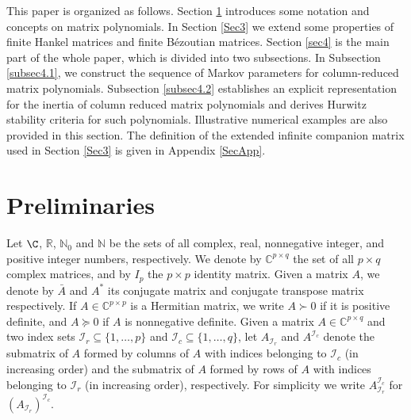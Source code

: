 \documentclass[12pt,reqno]{amsart}
\theoremstyle{plain}
\numberwithin{equation}{section}
\theoremstyle{remark}
\def \N{\mathbb N} \def\B{\mathfrak B}
\newcommand{\R}{\mathbb{R}}
\begin{document}
This paper is organized as follows. Section \ref{Sec2} introduces some notation and concepts on matrix polynomials. In Section \ref{Sec3} we extend some properties of finite Hankel matrices and finite B\'ezoutian matrices. Section \ref{sec4} is the main part of the whole paper, which is divided into two subsections. In Subsection \ref{subsec4.1}, we construct the sequence of Markov parameters for column-reduced matrix polynomials. Subsection \ref{subsec4.2} establishes an explicit  representation for the inertia of column reduced matrix polynomials and derives Hurwitz stability criteria for such polynomials. Illustrative numerical examples are also provided in this section. The definition of the extended infinite companion matrix used in Section \ref{Sec3} is given in Appendix \ref{SecApp}. 


\section{Preliminaries}\label{Sec2}
 Let $\C$, $\R$, $\N_0$ and $\N$ be the sets
of all complex, real, nonnegative integer, and positive integer numbers, respectively. We denote by $\mathbb C^{p\times q}$ the set of all $p\times q$ complex matrices, and by  $I_p$ the $p\times p$ identity matrix. 
Given a matrix $A$, we denote by $\bar A$ and $A^*$ its conjugate matrix and  conjugate transpose matrix respectively. If $A\in \mathbb C^{p\times p}$ is a Hermitian matrix, we write $A\succ 0$ if it is positive definite, and $A\succeq 0$ if $A$ is nonnegative definite.
Given a matrix $A\in \mathbb C^{p\times q}$ and two index sets $\mathcal I_r\subseteq \{1,\ldots,p\}$ and $\mathcal I_c\subseteq \{1,\ldots,q\}$, let $A_{\mathcal I_r}$  and $A^{\mathcal I_c}$ denote the submatrix of $A$ formed by columns of $A$ with indices belonging to $\mathcal I_c$ (in increasing order) and the submatrix of $A$ formed by rows of $A$ with indices belonging to $\mathcal I_r$ (in increasing order), respectively. For simplicity we write $A_{\mathcal I_r}^{\mathcal I_c}$ for $(A_{\mathcal I_r})^{\mathcal I_c}$.
\end{document}
